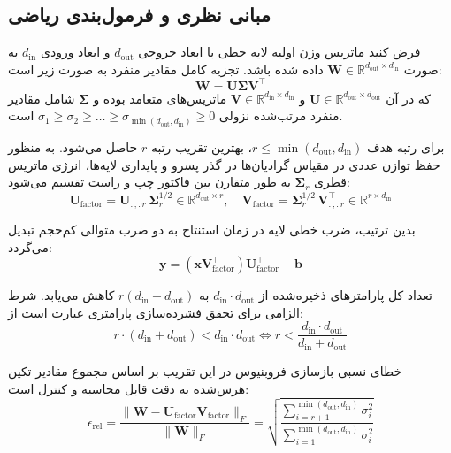 \subsection{مبانی نظری و فرمول‌بندی ریاضی}
فرض کنید ماتریس وزن اولیه لایه خطی با ابعاد خروجی $d_{\text{out}}$ و ابعاد ورودی $d_{\text{in}}$ به صورت $\mathbf{W} \in \mathbb{R}^{d_{\text{out}} \times d_{\text{in}}}$ داده شده باشد. تجزیه کامل مقادیر منفرد به صورت زیر است:
\begin{equation}
\mathbf{W} = \mathbf{U} \mathbf{\Sigma} \mathbf{V}^\top
\end{equation}
که در آن $\mathbf{U} \in \mathbb{R}^{d_{\text{out}} \times d_{\text{out}}}$ و $\mathbf{V} \in \mathbb{R}^{d_{\text{in}} \times d_{\text{in}}}$ ماتریس‌های متعامد بوده و $\mathbf{\Sigma}$ شامل مقادیر منفرد مرتب‌شده نزولی $\sigma_1 \ge \sigma_2 \ge \dots \ge \sigma_{\min(d_{\text{out}}, d_{\text{in}})} \ge 0$ است.

برای رتبه هدف $r \le \min(d_{\text{out}}, d_{\text{in}})$، بهترین تقریب رتبه $r$ حاصل می‌شود. به منظور حفظ توازن عددی در مقیاس گرادیان‌ها در گذر پسرو و پایداری لایه‌ها، انرژی ماتریس قطری $\mathbf{\Sigma}_r$ به طور متقارن بین فاکتور چپ و راست تقسیم می‌شود:
\begin{equation}
\mathbf{U}_{\text{factor}} = \mathbf{U}_{:, :r} \, \mathbf{\Sigma}_r^{1/2} \in \mathbb{R}^{d_{\text{out}} \times r}, \quad \mathbf{V}_{\text{factor}} = \mathbf{\Sigma}_r^{1/2} \, \mathbf{V}_{:, :r}^\top \in \mathbb{R}^{r \times d_{\text{in}}}
\end{equation}

بدین ترتیب، ضرب خطی لایه در زمان استنتاج به دو ضرب متوالی کم‌حجم تبدیل می‌گردد:
\begin{equation}
\mathbf{y} = (\mathbf{x} \mathbf{V}_{\text{factor}}^\top) \mathbf{U}_{\text{factor}}^\top + \mathbf{b}
\end{equation}

تعداد کل پارامترهای ذخیره‌شده از $d_{\text{in}} \cdot d_{\text{out}}$ به $r(d_{\text{in}} + d_{\text{out}})$ کاهش می‌یابد. شرط الزامی برای تحقق فشرده‌سازی پارامتری عبارت است از:
\begin{equation}
r \cdot (d_{\text{in}} + d_{\text{out}}) < d_{\text{in}} \cdot d_{\text{out}} \iff r < \frac{d_{\text{in}} \cdot d_{\text{out}}}{d_{\text{in}} + d_{\text{out}}}
\end{equation}

خطای نسبی بازسازی فروبنیوس در این تقریب بر اساس مجموع مقادیر تکین هرس‌شده به دقت قابل محاسبه و کنترل است:
\begin{equation}
\epsilon_{\text{rel}} = \frac{\|\mathbf{W} - \mathbf{U}_{\text{factor}} \mathbf{V}_{\text{factor}}\|_F}{\|\mathbf{W}\|_F} = \sqrt{\frac{\sum_{i=r+1}^{\min(d_{\text{out}}, d_{\text{in}})} \sigma_i^2}{\sum_{i=1}^{\min(d_{\text{out}}, d_{\text{in}})} \sigma_i^2}}
\end{equation}

